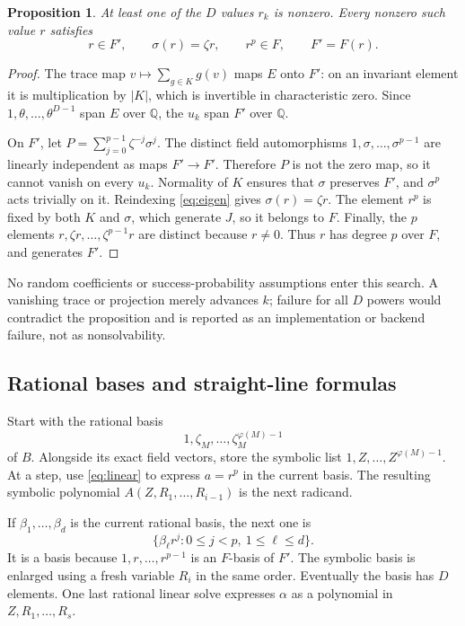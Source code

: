 \documentclass[11pt,letterpaper]{article}
\newtheorem{proposition}[theorem]{Proposition}
\theoremstyle{definition}\newtheorem{definition}[theorem]{Definition}
\theoremstyle{remark}\newtheorem{remark}[theorem]{Remark}
\newcommand{\Q}{\mathbb Q}
\begin{document}
\begin{proposition}\label{prop:generator}
At least one of the $D$ values $r_k$ is nonzero. Every nonzero such value
$r$ satisfies
\[
 r\in F',\qquad \sigma(r)=\zeta r,\qquad r^p\in F,
 \qquad F'=F(r).
\]
\end{proposition}
\begin{proof}
The trace map $v\mapsto\sum_{g\in K}g(v)$ maps $E$ onto $F'$: on an
invariant element it is multiplication by $|K|$, which is invertible in
characteristic zero. Since $1,\theta,\ldots,\theta^{D-1}$ span $E$ over
$\Q$, the $u_k$ span $F'$ over $\Q$.

On $F'$, let $P=\sum_{j=0}^{p-1}\zeta^{-j}\sigma^j$.
The distinct field automorphisms $1,\sigma,\ldots,\sigma^{p-1}$ are
linearly independent as maps $F'\to F'$. Therefore $P$ is not the zero
map, so it cannot vanish on every $u_k$. Normality of $K$ ensures that
$\sigma$ preserves $F'$, and $\sigma^p$ acts trivially on it. Reindexing
\eqref{eq:eigen} gives $\sigma(r)=\zeta r$. The element $r^p$ is fixed
by both $K$ and $\sigma$, which generate $J$, so it belongs to $F$.
Finally, the $p$ elements $r,\zeta r,\ldots,\zeta^{p-1}r$ are distinct
because $r\ne0$. Thus $r$ has degree $p$ over $F$, and generates $F'$.
\end{proof}

No random coefficients or success-probability assumptions enter this
search. A vanishing trace or projection merely advances $k$; failure for
all $D$ powers would contradict the proposition and is reported as an
implementation or backend failure, not as nonsolvability.

\subsection{Rational bases and straight-line formulas}
Start with the rational basis
\[
 1,\zeta_M,\ldots,\zeta_M^{\varphi(M)-1}
\]
of $B$. Alongside its exact field vectors, store the symbolic list
$1,Z,\ldots,Z^{\varphi(M)-1}$. At a step, use
\eqref{eq:linear} to express $a=r^p$ in the current basis. The resulting
symbolic polynomial $A(Z,R_1,\ldots,R_{i-1})$ is the next radicand.

If $\beta_1,\ldots,\beta_d$ is the current rational basis, the next one is
\begin{equation}\label{eq:basisupdate}
 \{\beta_\ell r^j:0\leq j<p,\ 1\leq\ell\leq d\}.
\end{equation}
It is a basis because $1,r,\ldots,r^{p-1}$ is an $F$-basis of $F'$.
The symbolic basis is enlarged using a fresh variable $R_i$ in the same
order. Eventually the basis has $D$ elements. One last rational linear
solve expresses $\alpha$ as a polynomial in $Z,R_1,\ldots,R_s$.
\end{document}
